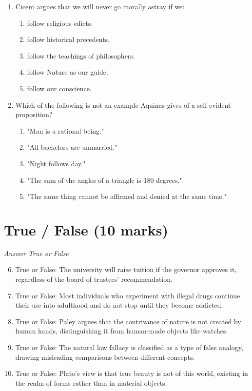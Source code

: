 \documentclass[12pt]{article}
\begin{document}
\begin{enumerate}[label=\arabic*.]
\item Cicero argues that we will never go morally astray if we:
\begin{enumerate}[label=(\alph*)]
    \item follow religious edicts.
    \item follow historical precedents.
    \item follow the teachings of philosophers.
    \item follow Nature as our guide.
    \item follow our conscience.
\end{enumerate}
\item Which of the following is not an example Aquinas gives of a self-evident proposition?
\begin{enumerate}[label=(\alph*)]
    \item "Man is a rational being."
    \item "All bachelors are unmarried."
    \item "Night follows day."
    \item "The sum of the angles of a triangle is 180 degrees."
    \item "The same thing cannot be affirmed and denied at the same time."
\end{enumerate}
\end{enumerate}

\section*{True / False (10 marks)}
\textit{Answer True or False}
\begin{enumerate}[label=\arabic*.]
\setcounter{enumi}{5}
\item True or False: The university will raise tuition if the governor approves it, regardless of the board of trustees' recommendation.
\item True or False: Most individuals who experiment with illegal drugs continue their use into adulthood and do not stop until they become addicted.
\item True or False: Paley argues that the contrivance of nature is not created by human hands, distinguishing it from human-made objects like watches.
\item True or False: The natural law fallacy is classified as a type of false analogy, drawing misleading comparisons between different concepts.
\item True or False: Plato's view is that true beauty is not of this world, existing in the realm of forms rather than in material objects.
\end{enumerate}
\end{document}
